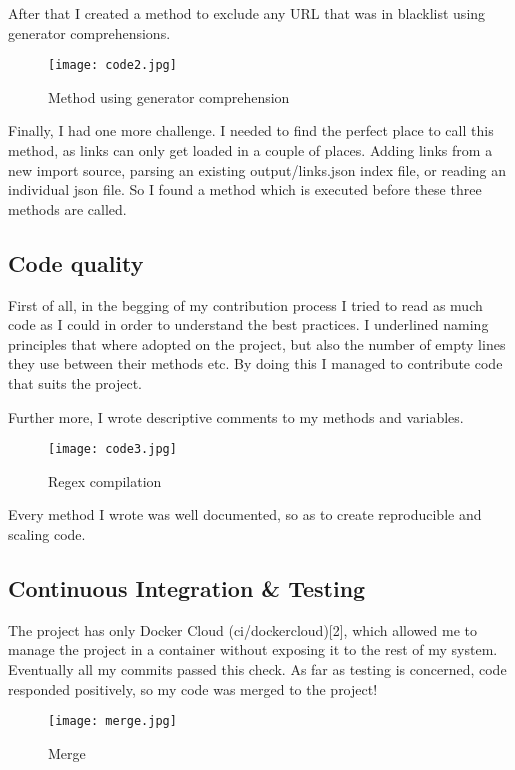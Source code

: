 \documentclass{article}
\begin{document}
After that I created a method to exclude any URL that was in blacklist using generator comprehensions. 

\begin{figure}[tph!]
\centerline{\texttt{[image: code2.jpg]}}
    \caption{Method using generator comprehension}
    \label{fig:verticalcell}
\end{figure}

Finally, I had one more challenge. I needed to find the perfect place to call this method, as links can only get loaded in a couple of places. Adding links from a new import source, parsing an existing output/links.json index file, or reading an individual json file. So I found a method which is executed before these three methods are called. 

\subsection{Code quality}

First of all, in the begging of my contribution process I tried to read as much code as I could in order to understand the best practices. I underlined naming principles that where adopted on the project, but also the number of empty lines they use between their methods etc. By doing this I managed to contribute code that suits the project.

Further more, I wrote descriptive comments to my methods and variables. 
\begin{figure}[tph!]
\centerline{\texttt{[image: code3.jpg]}}
    \caption{Regex compilation}
    \label{fig:verticalcell}
\end{figure}

Every method I wrote was well documented, so as to create reproducible and scaling code.

\subsection{Continuous Integration \& Testing}
The project has only Docker Cloud (ci/dockercloud)[2], which allowed me to manage the project in a container without exposing it to the rest of my system. Eventually all my commits passed this check. As far as testing is concerned, code responded positively, so my code was merged to the project!

\begin{figure}[tph!]
\centerline{\texttt{[image: merge.jpg]}}
    \caption{Merge}
    \label{fig:verticalcell}
\end{figure}
\end{document}

